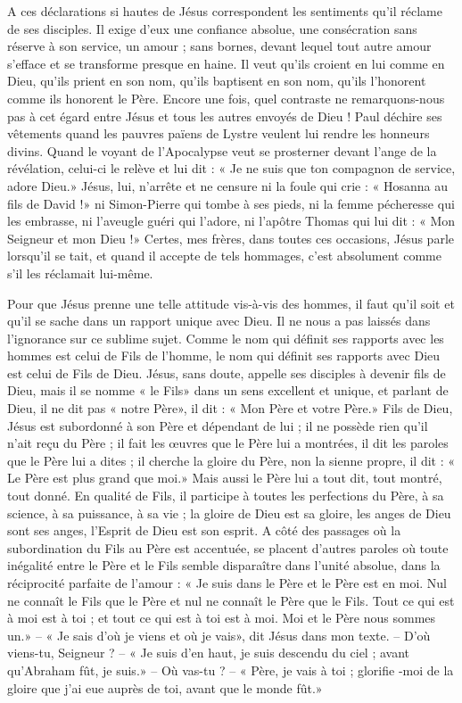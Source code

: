 A ces déclarations si hautes de Jésus correspondent les sentiments qu’il réclame de ses disciples. Il exige d’eux une confiance absolue, une consécration sans réserve à son service, un amour ; sans bornes, devant lequel tout autre amour s’efface et se transforme presque en haine. Il veut qu’ils croient en lui comme en Dieu, qu’ils prient en son nom, qu’ils baptisent en son nom, qu’ils l’honorent comme ils honorent le Père. Encore une fois, quel contraste ne remarquons-nous pas à cet égard entre Jésus et tous les autres envoyés de Dieu ! Paul déchire ses vêtements quand les pauvres païens de Lystre veulent lui rendre les honneurs divins. Quand le voyant de l’Apocalypse veut se prosterner devant l’ange de la révélation, celui-ci le relève et lui dit : « Je ne suis que ton compagnon de service, adore Dieu.» Jésus, lui, n’arrête et ne censure ni la foule qui crie : « Hosanna au fils de David !» ni Simon-Pierre qui tombe à ses pieds, ni la femme pécheresse qui les embrasse, ni l’aveugle guéri qui l’adore, ni l’apôtre Thomas qui lui dit : « Mon Seigneur et mon Dieu !» Certes, mes frères, dans toutes ces occasions, Jésus parle lorsqu’il se tait, et quand il accepte de tels hommages, c’est absolument comme s’il les réclamait lui-même.

Pour que Jésus prenne une telle attitude vis-à-vis des hommes, il faut qu’il soit et qu’il se sache dans un rapport unique avec Dieu. Il ne nous a pas laissés dans l’ignorance sur ce sublime sujet. Comme le nom qui définit ses rapports avec les hommes est celui de Fils de l’homme, le nom qui définit ses rapports avec Dieu est celui de Fils de Dieu. Jésus, sans doute, appelle ses disciples à devenir fils de Dieu, mais il se nomme « le Fils» dans un sens excellent et unique, et parlant de Dieu, il ne dit pas « notre Père», il dit : « Mon Père et votre Père.» Fils de Dieu, Jésus est subordonné à son Père et dépendant de lui ; il ne possède rien qu’il n’ait reçu du Père ; il fait les œuvres que le Père lui a montrées, il dit les paroles que le Père lui a dites ; il cherche la gloire du Père, non la sienne propre, il dit : « Le Père est plus grand que moi.» Mais aussi le Père lui a tout dit, tout montré, tout donné. En qualité de Fils, il participe à toutes les perfections du Père, à sa science, à sa puissance, à sa vie ; la gloire de Dieu est sa gloire, les anges de Dieu sont ses anges, l’Esprit de Dieu est son esprit. A côté des passages où la subordination du Fils au Père est accentuée, se placent d’autres paroles où toute inégalité entre le Père et le Fils semble disparaître dans l’unité absolue, dans la réciprocité parfaite de l’amour : « Je suis dans le Père et le Père est en moi. Nul ne connaît le Fils que le Père et nul ne connaît le Père que le Fils. Tout ce qui est à moi est à toi ; et tout ce qui est à toi est à moi. Moi et le Père nous sommes un.» – « Je sais d’où je viens et où je vais», dit Jésus dans mon texte. – D’où viens-tu, Seigneur ? – « Je suis d’en haut, je suis descendu du ciel ; avant qu’Abraham fût, je suis.» – Où vas-tu ? – « Père, je vais à toi ; glorifie -moi de la gloire que j’ai eue auprès de toi, avant que le monde fût.»

